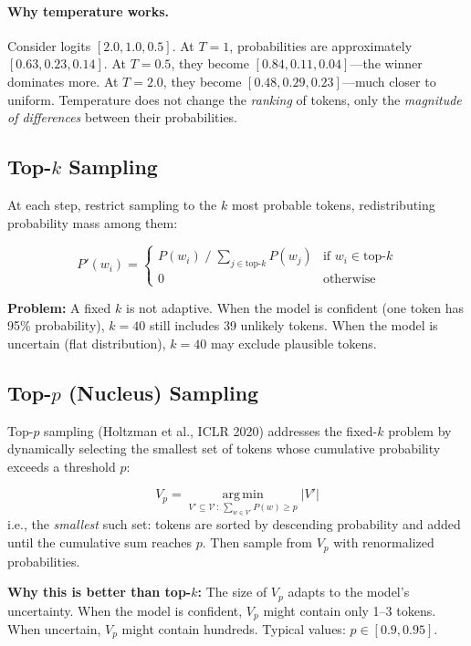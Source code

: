 \paragraph{Why temperature works.}
Consider logits $[2.0, 1.0, 0.5]$.  At $T{=}1$, probabilities are approximately
$[0.63, 0.23, 0.14]$.  At $T{=}0.5$, they become $[0.84, 0.11, 0.04]$---the
winner dominates more.  At $T{=}2.0$, they become $[0.48, 0.29, 0.23]$---much
closer to uniform.  Temperature does not change the \emph{ranking} of tokens, only the
\emph{magnitude of differences} between their probabilities.

\subsection{Top-$k$ Sampling}

At each step, restrict sampling to the $k$ most probable tokens, redistributing
probability mass among them:

\[
    P'(w_i) = \begin{cases}
        P(w_i) \;/\; \sum_{j \in \text{top-}k} P(w_j) & \text{if } w_i \in \text{top-}k \\[4pt]
        0 & \text{otherwise}
    \end{cases}
\]

\textbf{Problem:}  A fixed $k$ is not adaptive.  When the model is confident
(one token has 95\% probability), $k{=}40$ still includes 39 unlikely tokens.
When the model is uncertain (flat distribution), $k{=}40$ may exclude plausible
tokens.

\subsection{Top-$p$ (Nucleus) Sampling}

Top-$p$ sampling (Holtzman et al., ICLR 2020) addresses the fixed-$k$ problem by
dynamically selecting the smallest set of tokens whose cumulative probability
exceeds a threshold $p$:

\[
    V_p = \operatorname*{arg\,min}_{V' \subseteq \mathcal{V} \,:\, \sum_{w \in V'} P(w) \geq p} |V'|
\]
i.e., the \emph{smallest} such set: tokens are sorted by descending probability
and added until the cumulative sum reaches $p$.  Then sample from $V_p$ with renormalized probabilities.

\textbf{Why this is better than top-$k$:}  The size of $V_p$ adapts to the
model's uncertainty.  When the model is confident, $V_p$ might contain only
1--3 tokens.  When uncertain, $V_p$ might contain hundreds.  Typical values:
$p \in [0.9, 0.95]$.

